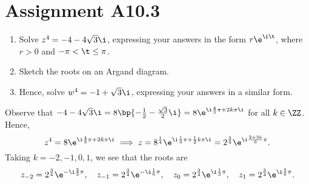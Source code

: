 \section{Assignment A10.3}

\begin{problem}
    \begin{enumerate}
        \item Solve $z^4 = -4 - 4\sqrt3 \i$, expressing your answers in the form $r\e^{\i\t}$, where $r > 0$ and $-\pi < \t \leq \pi$.
        \item Sketch the roots on an Argand diagram.
        \item Hence, solve $w^4 = -1 + \sqrt3 \i$, expressing your answers in a similar form.
    \end{enumerate}
\end{problem}
\begin{solution}
    \begin{ppart}
        Observe that $-4-4\sqrt3\i = 8\bp{-\frac12 - \frac{\sqrt3}2\i} = 8\e^{\i\frac43 \pi + 2k\pi \i}$ for all $k \in \ZZ$. Hence, \[z^4 = 8\e^{\i\frac43 \pi + 2k\pi \i} \implies z = 8^{\frac14} \e^{\i\frac13 \pi + \frac12 k\pi \i} = 2^{\frac34} \e^{\i \frac{2 + 3k}{6} \pi}.\] Taking $k = -2, -1, 0, 1$, we see that the roots are \[z_{-2} = 2^{\frac34} \e^{-\i\frac23\pi}, \quad z_{-1} = 2^{\frac34} \e^{-\i\frac16\pi}, \quad z_{0} = 2^{\frac34} \e^{\i\frac13\pi}, \quad z_{1} = 2^{\frac34} \e^{\i\frac56\pi}.\]
    \end{ppart}
    \begin{ppart}
        \begin{center}
\end{center}
\end{ppart}
\end{solution}
